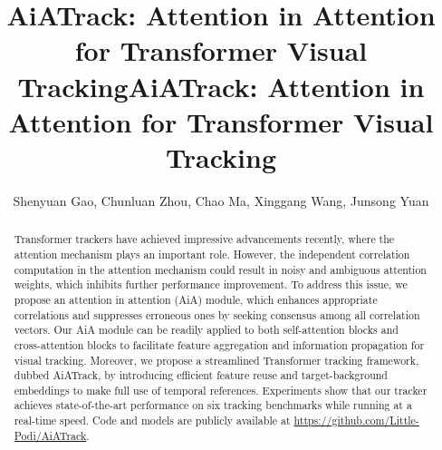 \title{AiATrack: Attention in Attention for Transformer Visual Tracking}



\pagestyle{headings}
\mainmatter
\def\ECCVSubNumber{1951}  %

\title{AiATrack: Attention in Attention for Transformer Visual Tracking} %

\begin{comment}
\titlerunning{ECCV-22 submission ID \ECCVSubNumber} 
\authorrunning{ECCV-22 submission ID \ECCVSubNumber} 
\author{Anonymous ECCV submission}
\institute{Paper ID \ECCVSubNumber}
\end{comment}

\author{Shenyuan Gao, 
Chunluan Zhou, 
Chao Ma, 
Xinggang Wang, 
Junsong Yuan}

\maketitle

\begin{abstract}
Transformer trackers have achieved impressive advancements recently, where the attention mechanism plays an important role. However, the independent correlation computation in the attention mechanism could result in noisy and ambiguous attention weights, which inhibits further performance improvement. To address this issue, we propose an attention in attention (AiA) module, which enhances appropriate correlations and suppresses erroneous ones by seeking consensus among all correlation vectors. Our AiA module can be readily applied to both self-attention blocks and cross-attention blocks to facilitate feature aggregation and information propagation for visual tracking. Moreover, we propose a streamlined Transformer tracking framework, dubbed AiATrack, by introducing efficient feature reuse and target-background embeddings to make full use of temporal references. Experiments show that our tracker achieves state-of-the-art performance on six tracking benchmarks while running at a real-time speed. Code and models are publicly available at \href{https://github.com/Little-Podi/AiATrack}{https://github.com/Little-Podi/AiATrack}.
\end{abstract}

